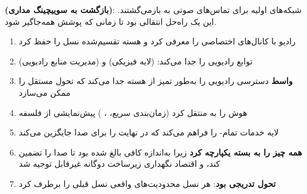 \begin{CNquote}

\textbf{ (بازگشت به سوییچینگ مداری)}: شبکه‌های  اولیه برای تماس‌های صوتی به  بازمی‌گشتند. این یک راه‌حل انتقالی بود تا زمانی که پوشش  همه‌جاگیر شود.

\end{CNquote}


\begin{enumerate}
\def\labelenumi{\arabic{enumi}.}
\tightlist
\item
   رادیو  با کانال‌های اختصاصی را معرفی کرد و هسته تقسیم‌شده  نسل  را حفظ کرد
\item
   توابع رادیویی را جدا می‌کند:  (لایه فیزیکی) و  (مدیریت منابع رادیویی)
\item
  \textbf{واسط } دسترسی رادیویی را به‌طور تمیز از هسته جدا می‌کند  که تحول مستقل را ممکن می‌سازد
\item
   هوش را به  منتقل کرد (زمان‌بندی سریع، ، )  پیش‌نمایشی از فلسفه 
\item
   لایه خدمات تمام- را فراهم می‌کند که در نهایت  را برای صدا جایگزین می‌کند
\item
  \textbf{ همه چیز را به بسته یکپارچه کرد} زیرا  به‌اندازه کافی بالغ شده بود تا  صدا را تضمین کند، و اقتصاد نگهداری زیرساخت دوگانه غیرقابل توجیه شد
\item
  \textbf{تحول تدریجی بود}: هر نسل محدودیت‌های واقعی نسل قبلی را برطرف کرد
\end{enumerate}


